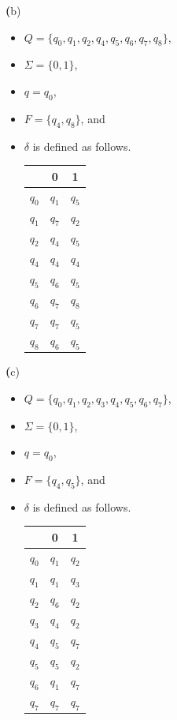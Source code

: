 \documentclass[11pt]{article}
\renewcommand{\part}[1] {{\vspace{0.15in}\noindent\textbf (#1)} \vspace{0.10in}}
\begin{document}
\part{b}
\begin{itemize}
	\item $Q = \{q_0, q_1, q_2, q_4, q_5, q_6, q_7, q_8\}$,	
	\item $\Sigma = \{0,1\}$,
	\item $q = q_0$,
	\item $F = \{q_4, q_8\}$, and
        \item $\delta$ is defined as follows. \\

\begin{tabular}{|c||c|c|}  \hline
      & 0 & 1 \\ \hline 
      $q_0$ & $q_1$ & $q_5$ \\ \hline 
      $q_1$ & $q_7$ & $q_2$ \\ \hline
      $q_2$ & $q_4$ & $q_5$ \\ \hline
      $q_4$ & $q_4$ & $q_4$ \\ \hline 
      $q_5$ & $q_6$ & $q_5$ \\ \hline 
      $q_6$ & $q_7$ & $q_8$ \\ \hline 
      $q_7$ & $q_7$ & $q_5$ \\ \hline 
      $q_8$ & $q_6$ & $q_5$ \\ \hline 
\end{tabular}
\end{itemize}

\part{c}
\begin{itemize}
	\item $Q = \{q_0, q_1, q_2, q_3, q_4, q_5, q_6, q_7\}$,	
	\item $\Sigma = \{0,1\}$,
	\item $q = q_0$,
	\item $F = \{q_4, q_5\}$, and
        \item $\delta$ is defined as follows. \\

\begin{tabular}{|c||c|c|}  \hline
      & 0 & 1 \\ \hline 
      $q_0$ & $q_1$ & $q_2$ \\ \hline 
      $q_1$ & $q_1$ & $q_3$ \\ \hline
      $q_2$ & $q_6$ & $q_2$ \\ \hline
      $q_3$ & $q_4$ & $q_2$ \\ \hline 
      $q_4$ & $q_5$ & $q_7$ \\ \hline 
      $q_5$ & $q_5$ & $q_2$ \\ \hline 
      $q_6$ & $q_1$ & $q_7$ \\ \hline 
      $q_7$ & $q_7$ & $q_7$ \\ \hline 
\end{tabular}

\end{itemize}
\end{document}
